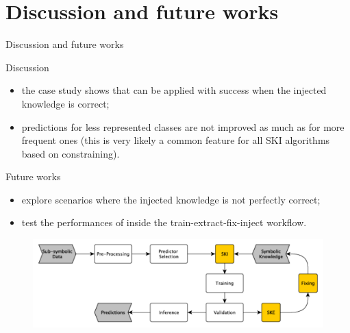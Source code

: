 \documentclass[presentation]{beamer}\mode<presentation>{\usetheme{AMSBolognaFC}}
\begin{document}
\section{Discussion and future works}

\begin{frame}[allowframebreaks]{Discussion and future works}
    
    \begin{block}{Discussion}
        \begin{itemize}
            \item the case study shows that \killshort{} can be applied with success when the injected knowledge is correct;
            \item predictions for less represented classes are not improved as much as for more frequent ones (this is very likely a common feature for all  SKI algorithms based on constraining).
        \end{itemize}
    \end{block}
    
    \framebreak
    
    \begin{block}{Future works}
        \begin{itemize}
            \item explore scenarios where the injected knowledge is not perfectly correct;
            \item test the performances of \killshort{} inside the train-extract-fix-inject workflow.
        \end{itemize}
    \end{block}

    \begin{figure}
        \centering
        \includegraphics[width=\textwidth]{figures/ske-ski-workflow}
    \end{figure}
\end{frame}
\end{document}
